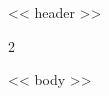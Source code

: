 \documentclass[9pt,letterpaper]{article}
\begin{document}
<< header >>

\vspace{1em}

\setlength{\columnsep}{2.5em}

\begin{paracol}{2}

<< body >>

\end{paracol}
\end{document}
